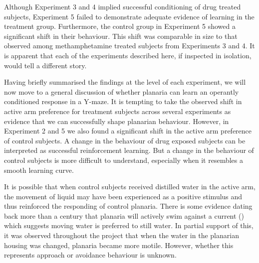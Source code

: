 \documentclass[
  jou,
  floatsintext,
  longtable,
  nolmodern,
  notxfonts,
  notimes,
  donotrepeattitle,
  colorlinks=true,linkcolor=blue,citecolor=blue,urlcolor=blue]{apa7}
\begin{document}
Although Experiment 3 and 4 implied successful conditioning of drug
treated subjects, Experiment 5 failed to demonstrate adequate evidence
of learning in the treatment group. Furthermore, the control group in
Experiment 5 showed a significant shift in their behaviour. This shift
was comparable in size to that observed among methamphetamine treated
subjects from Experiments 3 and 4. It is apparent that each of the
experiments described here, if inspected in isolation, would tell a
different story.

Having briefly summarised the findings at the level of each experiment,
we will now move to a general discussion of whether planaria can learn
an operantly conditioned response in a Y-maze. It is tempting to take
the observed shift in active arm preference for treatment subjects
across several experiments as evidence that we can successfully shape
planarian behaviour. However, in Experiment 2 and 5 we also found a
significant shift in the active arm preference of control subjects. A
change in the behaviour of drug exposed subjects can be interpreted as
successful reinforcement learning. But a change in the behaviour of
control subjects is more difficult to understand, especially when it
resembles a smooth learning curve.

It is possible that when control subjects received distilled water in
the active arm, the movement of liquid may have been experienced as a
positive stimulus and thus reinforced the responding of control
planaria. There is some evidence dating back more than a century that
planaria will actively swim against a current
() which suggests
moving water is preferred to still water. In partial support of this, it
was observed throughout the project that when the water in the planarian
housing was changed, planaria became more motile. However, whether this
represents approach or avoidance behaviour is unknown.
\end{document}
